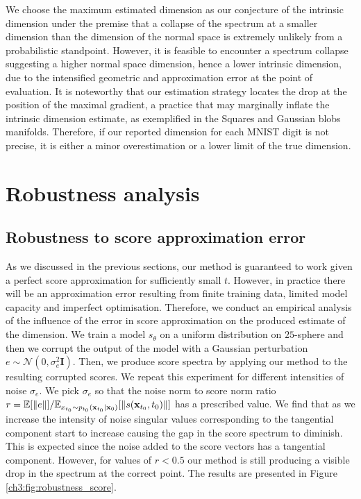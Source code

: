    We choose the maximum estimated dimension as our conjecture of the intrinsic dimension under the premise that a collapse of the spectrum at a smaller dimension than the dimension of the normal space is extremely unlikely from a probabilistic standpoint.  However, it is feasible to encounter a spectrum collapse suggesting a higher normal space dimension, hence a lower intrinsic dimension, due to the intensified geometric and approximation error at the point of evaluation. It is noteworthy that our estimation strategy locates the drop at the position of the maximal gradient, a practice that may marginally inflate the intrinsic dimension estimate, as exemplified in the Squares and Gaussian blobs manifolds. Therefore, if our reported dimension for each MNIST digit is not precise, it is either a minor overestimation or a lower limit of the true dimension.
   
\section{Robustness analysis}
   \label{ch3:appendix:robust}
   \subsection{Robustness to score approximation error}
   As we discussed in the previous sections, our method is guaranteed to work given a perfect score approximation for sufficiently small $t$. However, in practice there will be an approximation error resulting from finite training data, limited model capacity and imperfect optimisation. Therefore, we conduct an empirical analysis of the influence of the error in score approximation on the produced estimate of the dimension. We train a model $s_\theta$ on a uniform distribution on $25$-sphere and then we corrupt the output of the model with a Gaussian perturbation $e \sim \mathcal{N}(0, \sigma^2_e\textbf{I})$. Then, we produce score spectra by applying our method to the resulting corrupted scores. We repeat this experiment for different intensities of noise $\sigma_e$. We pick $\sigma_e$ so that the noise norm to score norm ratio $r = \mathbb{E}[\left\lVert e \right\rVert] / \mathbb{E}_{x_{t_0} \sim p_{t_0}(\textbf{x}_{t_0} | \textbf{x}_0)}[\left\lVert s(\textbf{x}_{t_0} , t_0) \right\rVert]$ has a prescribed value. We find that as we increase the intensity of noise singular values corresponding to the tangential component start to increase causing the gap in the score spectrum  to diminish. This is expected since the noise added to the score vectors has a tangential component.  However, for values of $r < 0.5$ our method is still producing a visible drop in the spectrum at the correct point. The results are presented in Figure \ref{ch3:fig:robustness_score}.
   

